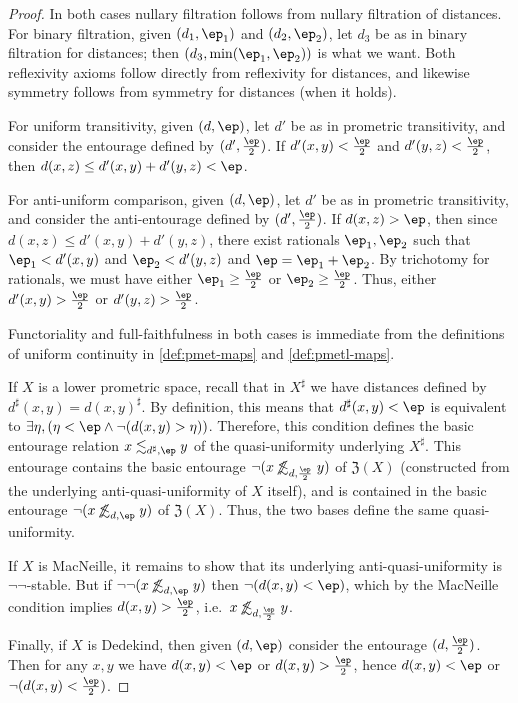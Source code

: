 \documentclass{article}
\def\upp#1{{#1}^{\sharp}}
\def\oapt{\mathrel{\!\not\,\not\lesssim}}
\def\leapx{\lesssim}
\def\hfep{\frac{\ep}{2}}
\def\fep#1#2{\frac{\if1#1\else#1\fi\ep}{#2}}
\def\neigh{\mathfrak{Z}}
\def\nn{\ensuremath{\neg\neg}}
\begin{document}
\begin{proof}
  In both cases nullary filtration follows from nullary filtration of distances.
  For binary filtration, given $(d_1,\ep_1)$ and $(d_2,\ep_2)$, let $d_3$ be as in binary filtration for distances; then $(d_3,\min(\ep_1,\ep_2))$ is what we want.
  Both reflexivity axioms follow directly from reflexivity for distances, and likewise symmetry follows from symmetry for distances (when it holds).

  For uniform transitivity, given $(d,\ep)$, let $d'$ be as in prometric transitivity, and consider the entourage defined by $(d',\hfep)$.
  If $d'(x,y)<\hfep$ and $d'(y,z)<\hfep$, then $d(x,z) \le d'(x,y)+d'(y,z)<\ep$.

  For anti-uniform comparison, given $(d,\ep)$, let $d'$ be as in prometric transitivity, and consider the anti-entourage defined by $(d',\fep12)$.
  If $d(x,z)>\ep$, then since $d(x,z)\le d'(x,y)+d'(y,z)$, there exist rationals $\ep_1,\ep_2$ such that $\ep_1<d'(x,y)$ and $\ep_2<d'(y,z)$ and $\ep = \ep_1+\ep_2$.
  By trichotomy for rationals, we must have either $\ep_1 \ge \fep12$ or $\ep_2\ge \fep12$.
  Thus, either $d'(x,y)>\hfep$ or $d'(y,z)>\hfep$.

  Functoriality and full-faithfulness in both cases is immediate from the definitions of uniform continuity in \cref{def:pmet-maps} and \cref{def:pmetl-maps}.

  If $X$ is a lower prometric space, recall that in $\upp{X}$ we have distances defined by $\upp{d}(x,y) = \upp{d(x,y)}$.
  By definition, this means that $\upp{d}(x,y)<\ep$ is equivalent to $\exists \eta, (\eta<\ep \land \neg(d(x,y)>\eta))$.
  Therefore, this condition defines the basic entourage relation $x \leapx_{\upp d,\ep} y$ of the quasi-uniformity underlying $\upp{X}$.
  This entourage contains the basic entourage $\neg (x \oapt_{d,\hfep} y)$ of $\neigh(X)$ (constructed from the underlying anti-quasi-uniformity of $X$ itself), and is contained in the basic entourage $\neg (x \oapt_{d,\ep} y)$ of $\neigh(X)$.
  Thus, the two bases define the same quasi-uniformity.

  If $X$ is MacNeille, it remains to show that its underlying anti-quasi-uniformity is \nn-stable.
  But if $\neg\neg(x \oapt_{d,\ep} y)$ then $\neg(d(x,y) < \ep)$, which by the MacNeille condition implies $d(x,y) > \hfep$, i.e.\ $x\oapt_{d,\hfep} y$.

  Finally, if $X$ is Dedekind, then given $(d,\ep)$ consider the entourage $(d,\hfep)$.
  Then for any $x,y$ we have $d(x,y)<\ep$ or $d(x,y)>\hfep$, hence $d(x,y)<\ep$ or $\neg(d(x,y)<\hfep)$.
\end{proof}
\end{document}
